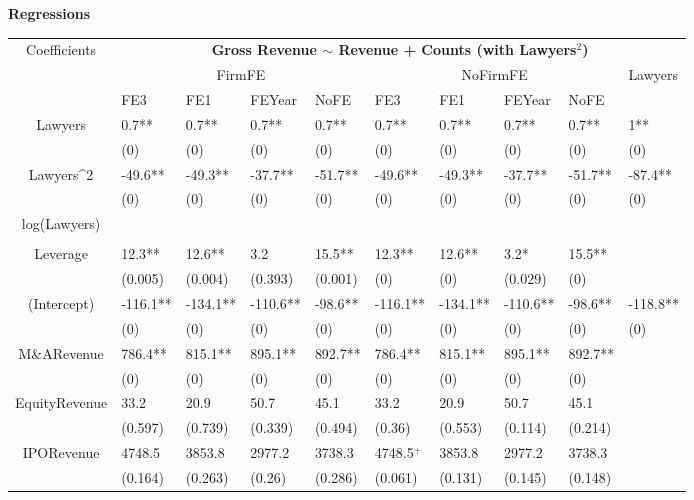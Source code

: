 \documentclass{article}
\begin{document}
\newpage

{\large \textbf{Regressions} }

\begin{table}[H]
\centering
\begin{tabular}{|clllllllll|}
\hline
\multirow{3}{*}{Coefficients} & \multicolumn{9}{c|}{\textbf{Gross Revenue $\sim$ Revenue + Counts (with Lawyers$^2$)}} \\
\cline{2-10}
& \multicolumn{4}{c}{FirmFE} & \multicolumn{4}{c}{NoFirmFE} & \multirow{2}{*}{Lawyers} \\
\cline{2-9}
& FE3 & FE1 & FEYear & NoFE & FE3 & FE1 & FEYear & NoFE &  \\
\hline
 
Lawyers & 0.7** & 0.7** & 0.7** & 0.7** & 0.7** & 0.7** & 0.7** & 0.7** & 1** \\ 
   & (0) & (0) & (0) & (0) & (0) & (0) & (0) & (0) & (0) \\ 
  Lawyers^2 & -49.6** & -49.3** & -37.7** & -51.7** & -49.6** & -49.3** & -37.7** & -51.7** & -87.4** \\ 
   & (0) & (0) & (0) & (0) & (0) & (0) & (0) & (0) & (0) \\ 
  log(Lawyers) &  &  &  &  &  &  &  &  &  \\ 
   &  &  &  &  &  &  &  &  &  \\ 
  Leverage & 12.3** & 12.6** & 3.2 & 15.5** & 12.3** & 12.6** & 3.2* & 15.5** &  \\ 
   & (0.005) & (0.004) & (0.393) & (0.001) & (0) & (0) & (0.029) & (0) &  \\ 
  (Intercept) & -116.1** & -134.1** & -110.6** & -98.6** & -116.1** & -134.1** & -110.6** & -98.6** & -118.8** \\ 
   & (0) & (0) & (0) & (0) & (0) & (0) & (0) & (0) & (0) \\ 
  M\&ARevenue & 786.4** & 815.1** & 895.1** & 892.7** & 786.4** & 815.1** & 895.1** & 892.7** &  \\ 
   & (0) & (0) & (0) & (0) & (0) & (0) & (0) & (0) &  \\ 
  EquityRevenue & 33.2 & 20.9 & 50.7 & 45.1 & 33.2 & 20.9 & 50.7 & 45.1 &  \\ 
   & (0.597) & (0.739) & (0.339) & (0.494) & (0.36) & (0.553) & (0.114) & (0.214) &  \\ 
  IPORevenue & 4748.5 & 3853.8 & 2977.2 & 3738.3 & 4748.5$^{+}$ & 3853.8 & 2977.2 & 3738.3 &  \\ 
   & (0.164) & (0.263) & (0.26) & (0.286) & (0.061) & (0.131) & (0.145) & (0.148) &  \\ 

\end{tabular}
\end{table}
\end{document}
